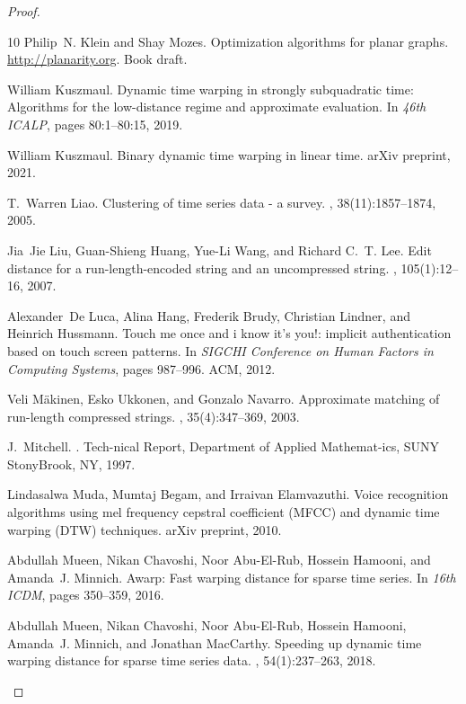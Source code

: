 \documentclass[10pt,a4paper]{article}
\begin{document}
\begin{proof}
\begin{thebibliography}{10}
Philip~N. Klein and Shay Mozes.
\newblock Optimization algorithms for planar graphs.
\newblock \url{http://planarity.org}.
\newblock Book draft.

William Kuszmaul.
\newblock Dynamic time warping in strongly subquadratic time: Algorithms for
  the low-distance regime and approximate evaluation.
\newblock In {\em 46th {ICALP}}, pages 80:1--80:15,
  2019.

William Kuszmaul.
\newblock Binary dynamic time warping in linear time.
\newblock arXiv preprint, 2021.

T.~Warren Liao.
\newblock Clustering of time series data - a survey.
, 38(11):1857--1874, 2005.

Jia~Jie Liu, Guan-Shieng Huang, Yue-Li Wang, and Richard C.~T. Lee.
\newblock Edit distance for a run-length-encoded string and an uncompressed
  string.
, 105(1):12--16, 2007.

Alexander~De Luca, Alina Hang, Frederik Brudy, Christian Lindner, and Heinrich
  Hussmann.
\newblock Touch me once and i know it's you!: implicit authentication based on
  touch screen patterns.
\newblock In {\em SIGCHI Conference on Human Factors in Computing Systems},
  pages 987--996. ACM, 2012.

Veli M{\"a}kinen, Esko Ukkonen, and Gonzalo Navarro.
\newblock Approximate matching of run-length compressed strings.
, 35(4):347--369, 2003.

J.~Mitchell.
.
\newblock Tech-nical Report, Department of Applied Mathemat-ics, SUNY
  StonyBrook, NY, 1997.

Lindasalwa Muda, Mumtaj Begam, and Irraivan Elamvazuthi.
\newblock Voice recognition algorithms using mel frequency cepstral coefficient
  ({MFCC}) and dynamic time warping ({DTW}) techniques.
\newblock arXiv preprint, 2010.

Abdullah Mueen, Nikan Chavoshi, Noor Abu{-}El{-}Rub, Hossein Hamooni, and
  Amanda~J. Minnich.
\newblock Awarp: Fast warping distance for sparse time series.
\newblock In {\em 16th {ICDM}}, pages 350--359, 2016.

Abdullah Mueen, Nikan Chavoshi, Noor Abu{-}El{-}Rub, Hossein Hamooni, Amanda~J.
  Minnich, and Jonathan MacCarthy.
\newblock Speeding up dynamic time warping distance for sparse time series
  data.
, 54(1):237--263, 2018.


\end{thebibliography}
\end{proof}
\end{document}

